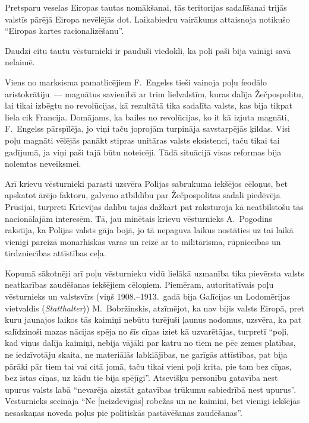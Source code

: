 \documentclass[twoside,a5paper,12pt,fleqn,openany]{extbook}
\newcommand{\detxti}[1]{\textit{\textgerman{#1}}}
\begin{document}
Pretsparu veselas Eiropas tautas nomākšanai, tās teritorijas sadalīšanai trijās valstīs pārējā Eiropa nevēlējās dot. Laikabiedru vairākums attaisnoja notikušo ``Eiropas kartes racionalizēšanu''.

Daudzi citu tautu vēsturnieki ir pauduši viedokli, ka poļi paši bija vainīgi savā nelaimē.

Viens no marksisma pamatlicējiem F.~Engelss tieši vainoja poļu feodālo aristokrātiju~--- magnātus savienībā ar trim lielvalstīm, kuras dalīja Žečpospolitu, lai tikai izbēgtu no revolūcijas, kā rezultātā tika sadalīta valsts, kas bija tikpat liela cik Francija. Domājams, ka bailes no revolūcijas, ko it kā izjuta magnāti, F.~Engelss pārspīlēja, jo viņi taču joprojām turpināja savstarpējās ķildas. Visi poļu magnāti vēlējās panākt stipras unitāras valsts eksistenci, taču tikai tai gadījumā, ja viņi paši tajā būtu noteicēji. Tādā situācijā visas reformas bija nolemtas neveiksmei.

Arī krievu vēsturnieki parasti uzsvēra Polijas sabrukuma iekšējos cēloņus, bet apskatot ārējo faktoru, galveno atbildību par Žečpospolitas sadali piedēvēja Prūsijai, turpretī Krievijas dalību tajās dažkārt pat raksturoja kā neatbilstošu tās nacionālajām interesēm. Tā, jau minētais krievu vēsturnieks A.~Pogodins rakstīja, ka Polijas valsts gāja bojā, jo tā nepaguva laikus nostāties uz tai laikā vienīgi pareizā monarhiskās varas un reizē ar to militārisma, rūpniecības un tirdzniecības attīstības ceļa.

Kopumā sākotnēji arī poļu vēsturnieku vidū lielākā uzmanība tika pievērsta valsts neatkarības zaudēšanas iekšējiem cēloņiem. Piemēram, autoritatīvais poļu vēsturnieks un valstsvīrs (viņš 1908.--1913.~gadā bija Galīcijas un Lodomērijas vietvaldis (\detxti{Statthalter})) M.~Bobržinskis, atzīmējot, ka nav bijis valsts Eiropā, pret kuru jaunajos laikos tās kaimiņi nebūtu turējuši ļaunus nodomus, uzsvēra, ka pat salīdzinoši mazas nācijas spēja no šīs cīņas iziet kā uzvarētājas, turpretī ``poļi, kad viņus dalīja kaimiņi, nebija vājāki par katru no tiem ne pēc zemes platības, ne iedzīvotāju skaita, ne materiālās labklājības, ne garīgās attīstības, pat bija pārāki pār tiem tai vai citā jomā, taču tikai vieni poļi krita, pie tam bez cīņas, bez īstas cīņas, uz kādu tie bija spējīgi''. Atsevišķu personību gatavība nest upurus valsts labā ``nevarēja aizstāt gatavības trūkumu sabiedrībā nest upurus''. Vēsturnieks secināja ``Ne [neizdevīgās] robežas un ne kaimiņi, bet vienīgi iekšējās nesaskaņas noveda poļus pie politiskās pastāvēšanas zaudēšanas''.
\end{document}
